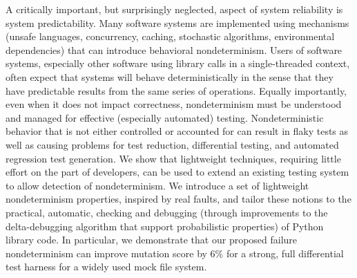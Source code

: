 A critically important, but surprisingly neglected, aspect of system reliability is system predictability.  Many software systems are implemented using mechanisms (unsafe languages, concurrency, caching, stochastic algorithms, environmental dependencies) that can introduce behavioral nondeterminism.  Users of software systems, especially other software using library calls in a single-threaded context, often expect that systems will behave deterministically in the sense that they have predictable results from the same series of operations.  Equally importantly, even when it does not impact correctness, nondeterminism must be understood and managed for effective (especially automated) testing.  Nondeterministic behavior that is not either controlled or accounted for can result in flaky tests as well as causing problems for test reduction, differential testing, and automated regression test generation.  We show that lightweight techniques, requiring little effort on the part of developers, can be used to extend an existing testing system to allow detection of nondeterminism.  We introduce a set of lightweight nondeterminism properties, inspired by real faults, and tailor these notions to the practical, automatic, checking and debugging (through improvements to the delta-debugging algorithm that support probabilistic properties) of Python library code.  In particular, we demonstrate that our proposed failure nondeterminism can improve mutation score by 6\% for a strong, full differential test harness for a widely used mock file system. 